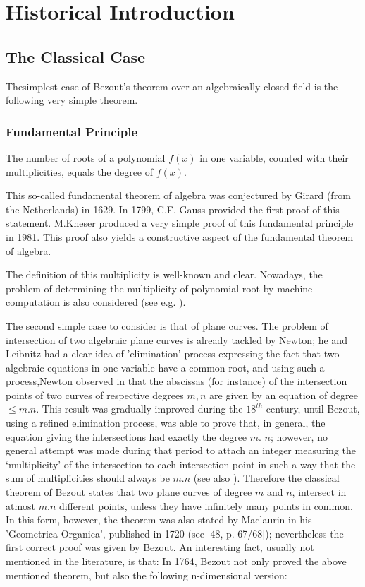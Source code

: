 \setcounter{chapter}{-1}
\chapter{Historical Introduction}\label{chap0}

\section{The Classical Case}\label{chap0:sec1} %

The\pageoriginale simplest case of Bezout's theorem over an algebraically closed
field is the following very simple theorem. 

\subsection{Fundamental Principle}\label{chap0:sec1:subsec0.1} %

The number of roots of a polynomial $f (x)$ in one
  variable, counted with their multiplicities, equals the degree of
$f(x)$. 

This so-called fundamental theorem of algebra was conjectured by
Girard (from the Netherlands) in 1629. In 1799, C.F. Gauss
provided the first proof of this statement. M.Kneser \cite{40} produced a
very simple proof of this fundamental principle in 1981. This proof
also yields a constructive aspect of the fundamental theorem of
algebra. 

The definition of this multiplicity is well-known and clear. Nowadays,
the problem of determining the multiplicity of polynomial root by
machine computation is also considered (see e.g. \cite{101}). 

The second simple case to consider is that of plane curves. The
problem of intersection of two algebraic plane curves is already
tackled by Newton; he and Leibnitz had a clear idea of 'elimination'
process expressing the fact that two algebraic equations in one
variable have a common root, and using such a  process,\pageoriginale Newton
observed in \cite{53} that the abscissas (for instance) of the
intersection points of two curves of respective degrees $m,n$ are
given by an equation of degree $\le m.n$. This result was gradually
improved during the $18^{th}$ century, until Bezout, using a refined
elimination process, was able to prove that, in general, the equation
giving the intersections had exactly the degree $m$. $n$; however, no
general attempt was made during that period to attach an integer
measuring the `multiplicity' of the intersection to each intersection
point in such a way that the sum of multiplicities should always be
$m.n$ (see also \cite{14}). Therefore the classical theorem of Bezout
states that two plane curves of degree $m$  and $n$, intersect in
atmost $m.n$ different points, unless they have infinitely many points
in common. In this form, however, the theorem was also stated by
Maclaurin in his 'Geometrica Organica', published in 1720 (see [48,
  p. 67/68]); nevertheless the first correct proof was given by
Bezout. An interesting fact, usually not mentioned in the literature,
is that:  In 1764, Bezout not only proved the above mentioned
theorem, but also the following n-dimensional version:

